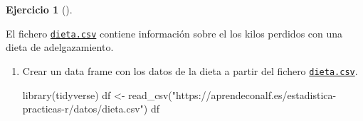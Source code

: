\documentclass[
  a4paper,
]{scrreport}
\newenvironment{Shaded}{\begin{snugshade}}{\end{snugshade}}
\newcommand{\FunctionTok}[1]{\textcolor[rgb]{0.28,0.35,0.67}{#1}}
\newcommand{\NormalTok}[1]{\textcolor[rgb]{0.00,0.23,0.31}{#1}}
\newcommand{\OtherTok}[1]{\textcolor[rgb]{0.00,0.23,0.31}{#1}}
\newcommand{\StringTok}[1]{\textcolor[rgb]{0.13,0.47,0.30}{#1}}
\theoremstyle{definition}
\newtheorem{exercise}{Ejercicio}[chapter]
\theoremstyle{remark}
\begin{document}
\begin{exercise}[]\protect\hypertarget{exr-regresion-5}{}\label{exr-regresion-5}

El fichero \href{datos/dieta.csv}{\texttt{dieta.csv}} contiene
información sobre el los kilos perdidos con una dieta de adelgazamiento.

\begin{enumerate}
\def\labelenumi{\alph{enumi}.}
\item
  Crear un data frame con los datos de la dieta a partir del fichero
  \href{https://aprendeconalf.es/estadistica-practicas-r/datos/dieta.csv}{\texttt{dieta.csv}}.

  \begin{tcolorbox}[enhanced jigsaw, colframe=quarto-callout-tip-color-frame, toprule=.15mm, bottomtitle=1mm, breakable, opacitybacktitle=0.6, toptitle=1mm, colback=white, bottomrule=.15mm, title=\textcolor{quarto-callout-tip-color}{\faLightbulb}\hspace{0.5em}{Solución}, arc=.35mm, left=2mm, titlerule=0mm, rightrule=.15mm, coltitle=black, leftrule=.75mm, opacityback=0, colbacktitle=quarto-callout-tip-color!10!white]

\begin{Shaded}
\begin{Highlighting}[]
\FunctionTok{library}\NormalTok{(tidyverse)}
\NormalTok{df }\OtherTok{\textless{}{-}} \FunctionTok{read\_csv}\NormalTok{(}\StringTok{"https://aprendeconalf.es/estadistica{-}practicas{-}r/datos/dieta.csv"}\NormalTok{)}
\NormalTok{df}
\end{Highlighting}
\end{Shaded}


\end{tcolorbox}
\end{enumerate}
\end{exercise}
\end{document}
